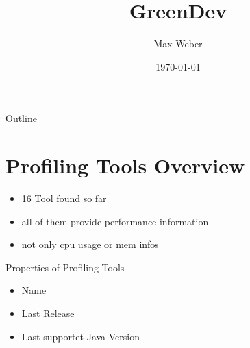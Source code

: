 \documentclass[11pt,aspectratio=169]{beamer}
\title[Green Development]{GreenDev}
\author[M. Weber]{Max Weber}
\institute[Bauhaus-Universität Weimar]{}
\date[\today]{\today}
\begin{document}

\maketitle

\begin{frame}{Outline}
\tableofcontents
\end{frame}

\section{Profiling Tools Overview}

\begin{frame}{}
  \begin{itemize}
    \item 16 Tool found so far
    \item all of them provide performance information
    \item not only cpu usage or mem infos
  \end{itemize}
\end{frame}

\begin{frame}{Properties of Profiling Tools}
  \begin{itemize}
    \item Name
    \item Last Release
    \item Last supportet Java Version
  \end{itemize}
\end{frame}


\end{document}

